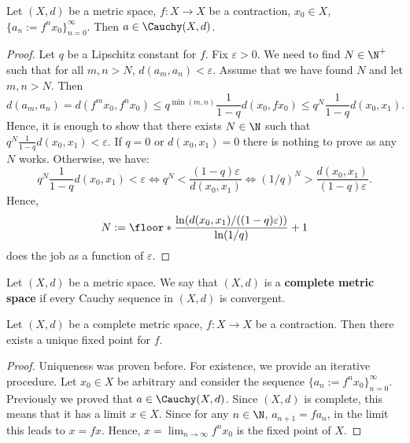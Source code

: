 \begin{proposition}
  Let
    $(X, d)$ be a metric space,
    $f \colon X \to X$ be a contraction,
    $x_0 \in X$,
    $\{a_n := f^n x_0\}_{n = 0}^\infty$.
  Then $a \in \Cauchy(X, d)$.
\end{proposition}
\begin{proof}
  Let $q$ be a Lipschitz constant for $f$.
  Fix $\varepsilon > 0$.
  We need to find $N \in \N^+$ such that
  for all $m, n > N$, $d(a_m, a_n) < \varepsilon$.
  Assume that we have found $N$ and let $m, n > N$.
  Then
  \begin{equation}
    d(a_m, a_n)
    = d(f^m x_0, f^n x_0)
    \leq q^{\min(m, n)} \frac{1}{1 - q} d(x_0, f x_0)
    \leq q^N \frac{1}{1 - q} d(x_0, x_1).
  \end{equation}
  Hence, it is enough to show that there exists $N \in \N$ such that
  $q^N \frac{1}{1 - q} d(x_0, x_1) < \varepsilon$.
  If $q = 0$ or $d(x_0, x_1) = 0$ there is nothing to prove as any $N$ works.
  Otherwise, we have:
  \begin{equation}
    q^N \frac{1}{1 - q} d(x_0, x_1) < \varepsilon
    \Leftrightarrow q^N < \frac{(1 - q) \varepsilon}{d(x_0, x_1)}
    \Leftrightarrow (1 / q)^N > \frac{d(x_0, x_1)}{(1 - q) \varepsilon}.
  \end{equation}
  Hence,
  \begin{equation}
    N
    := \floor*{\frac{\ln(d(x_0, x_1) / ((1 - q) \varepsilon))}{\ln(1 / q)}} + 1
  \end{equation}
  does the job as a function of $\varepsilon$.
\end{proof}
\begin{definition}
  Let $(X, d)$ be a metric space.
  We say that $(X, d)$ is a \textbf{complete metric space}
  if every Cauchy sequence in $(X, d)$ is convergent.
\end{definition}
\begin{theorem}
  \label{theorem:banach_fixed_point}
  Let
    $(X, d)$ be a complete metric space,
    $f \colon X \to X$ be a contraction.
  Then there exists a unique fixed point for $f$.
\end{theorem}
\begin{proof}
  Uniqueness was proven before.
  For existence, we provide an iterative procedure.
  Let $x_0 \in X$ be arbitrary and consider the sequence
  $\{a_n := f^n x_0\}_{n = 0}^\infty$.
  Previously we proved that $a \in \Cauchy(X, d)$.
  Since $(X, d)$ is complete, this means that it has a limit $x \in X$.
  Since for any $n \in \N$, $a_{n + 1} = f a_n$, in the limit this leads to
  $x = f x$.
  Hence, $x = \lim_{n \to \infty} f^n x_0$ is the fixed point of $X$.
\end{proof}
